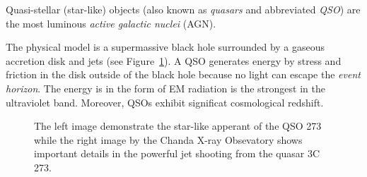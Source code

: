 Quasi-stellar (star-like) objects (also known as \textit{quasars} and abbreviated \textit{QSO}) are the most luminous \textit{active galactic nuclei} (AGN).~\cite{beckmann2013}

The physical model is a supermassive black hole surrounded by a gaseous accretion disk and jets (see Figure~\ref{3c_273}).
A QSO generates energy by stress and friction in the disk outside of the black hole because no light can escape the \textit{event horizon}.
The energy is in the form of EM radiation is the strongest in the ultraviolet band.
Moreover, QSOs exhibit significat cosmological redshift.

\begin{figure}
\begin{center}
\quad
{}
\end{center}
\caption[Image and jet of the quasar 3C 273]{
	The left image demonstrate the star-like apperant of the QSO 273
	while the right image by the Chanda X-ray Obsevatory shows important details in the powerful jet shooting from the quasar 3C 273.
}
\label{3c_273}
\end{figure}

